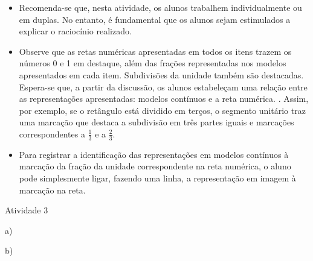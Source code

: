 \begin{multicols}{2}
\begin{itemize} %
    \item       Recomenda-se que, nesta atividade, os alunos trabalhem individualmente ou em duplas. No entanto, é fundamental que os alunos sejam estimulados a explicar o raciocínio realizado.
    \item       Observe que as retas numéricas apresentadas em todos os itens trazem os números 0 e 1 em destaque, além das frações representadas nos modelos apresentados em cada item. Subdivisões da unidade também são destacadas. Espera-se que, a partir da discussão, os alunos estabeleçam uma relação entre as representações apresentadas: modelos contínuos e a reta numérica. . Assim, por exemplo, se o retângulo está dividido em terços, o segmento unitário traz uma marcação que destaca a subdivisão em três partes iguais e marcações correspondentes a       $\frac{1}{3}$       e a       $\frac{2}{3}$. 
    \item       Para registrar a identificação das representações em modelos contínuos à marcação da fração da unidade correspondente na reta numérica, o aluno pode simplesmente ligar, fazendo uma linha, a representação em imagem à marcação na reta.
\end{itemize} %
  
  


\begin{resposta*} {Atividade 3}
 
a) 
 
\vspace{.3cm}
 
b)
 
\end{resposta*}
\end{multicols}
